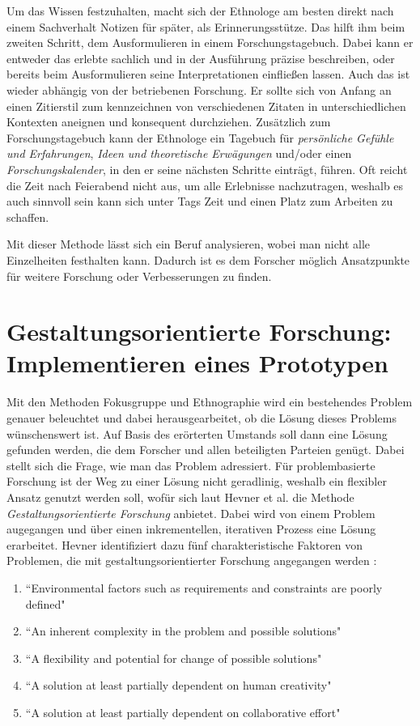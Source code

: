 Um das Wissen festzuhalten, macht sich der Ethnologe am besten direkt nach einem Sachverhalt Notizen für später, als Erinnerungsstütze. Das hilft ihm beim zweiten Schritt, dem Ausformulieren in einem Forschungstagebuch. Dabei kann er entweder das erlebte sachlich und in der Ausführung präzise beschreiben, oder bereits beim Ausformulieren seine Interpretationen einfließen lassen. Auch das ist wieder abhängig von der betriebenen Forschung. Er sollte sich von Anfang an einen Zitierstil zum kennzeichnen von verschiedenen Zitaten in unterschiedlichen Kontexten aneignen und konsequent durchziehen. Zusätzlich zum Forschungstagebuch kann der Ethnologe ein Tagebuch für \textit{persönliche Gefühle und Erfahrungen}, \textit{Ideen und theoretische Erwägungen} und/oder einen \textit{Forschungskalender}, in den er seine nächsten Schritte einträgt, führen. Oft reicht die Zeit nach Feierabend nicht aus, um alle Erlebnisse nachzutragen, weshalb es auch sinnvoll sein kann sich unter Tags Zeit und einen Platz zum Arbeiten zu schaffen. 

Mit dieser Methode lässt sich ein Beruf analysieren, wobei man nicht alle Einzelheiten festhalten kann. Dadurch ist es dem Forscher möglich Ansatzpunkte für weitere Forschung oder Verbesserungen zu finden.

\section{Gestaltungsorientierte Forschung: Implementieren eines Prototypen}
\label{sec:gestForsch}

Mit den Methoden Fokusgruppe und Ethnographie wird ein bestehendes Problem genauer beleuchtet und dabei herausgearbeitet, ob die Lösung dieses Problems wünschenswert ist. Auf Basis des erörterten Umstands soll dann eine Lösung gefunden werden, die dem Forscher und allen beteiligten Parteien genügt. Dabei stellt sich die Frage, wie man das Problem adressiert. Für problembasierte Forschung ist der Weg zu einer Lösung nicht geradlinig, weshalb ein flexibler Ansatz genutzt werden soll, wofür sich laut Hevner et al. \cite{hevner_design_nodate} die Methode \textit{Gestaltungsorientierte Forschung} anbietet. Dabei wird von einem Problem augegangen und über einen inkrementellen, iterativen Prozess eine Lösung erarbeitet. Hevner identifiziert dazu fünf charakteristische Faktoren von Problemen, die mit gestaltungsorientierter Forschung angegangen werden \cite{hevner_design_nodate}:

\begin{enumerate}
	\item ``Environmental factors such as requirements and constraints are poorly defined"
	\item ``An inherent complexity in the problem and possible solutions"
	\item ``A flexibility and potential for change of possible solutions"
	\item ``A solution at least partially dependent on human creativity"
	\item ``A solution at least partially dependent on collaborative effort"
\end{enumerate}

